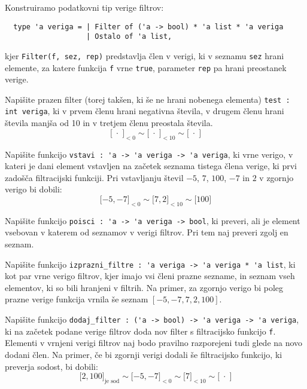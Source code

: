 \documentclass[arhiv]{../izpit}
\begin{document}
\naloga[]
\newcommand{\ostalo}[1]{\big[ #1 \big]}
\newcommand{\filter}[2]{\ostalo{ #2 }_{#1}}
\newcommand{\nic}{\;{\cdot}\;}
Konstruiramo podatkovni tip verige filtrov:
\begin{verbatim}
  type 'a veriga = | Filter of ('a -> bool) * 'a list * 'a veriga
                   | Ostalo of 'a list,
\end{verbatim}
kjer \verb|Filter(f, sez, rep)| predstavlja člen v verigi, ki v seznamu \verb|sez| hrani elemente,
za katere funkcija \verb|f| vrne \verb|true|, parameter \verb|rep| pa hrani preostanek verige.

\podnaloga
Napišite prazen filter (torej takšen, ki še ne hrani nobenega elementa) \verb|test : int veriga|,
ki v prvem členu hrani negativna števila, v drugem členu hrani števila manjša od 10 in
v tretjem členu preostala števila.
\[
  \filter{< 0}{\nic} \sim \filter{< 10}{\nic} \sim \ostalo{\nic}
\]

\podnaloga
Napišite funkcijo \verb|vstavi : 'a -> 'a veriga -> 'a veriga|,
ki vrne verigo, v kateri je dani element vstavljen na začetek seznama tistega člena verige, ki prvi zadošča filtracijski funkciji.
Pri vstavljanju števil $-5$, $7$, $100$, $-7$ in $2$ v zgornjo verigo bi dobili:
\[
  \filter{< 0}{{-5}, -7} \sim \filter{< 10}{7, 2} \sim \ostalo{100}
\]

\podnaloga
Napišite funkcijo \verb|poisci : 'a -> 'a veriga -> bool|,
ki preveri, ali je element vsebovan v katerem od seznamov v verigi filtrov. Pri tem naj preveri zgolj en seznam.

\podnaloga
Napišite funkcijo \verb|izprazni_filtre : 'a veriga -> 'a veriga * 'a list|,
ki kot par vrne verigo filtrov, kjer imajo vsi členi prazne sezname, in seznam vseh
elementov, ki so bili hranjeni v filtrih. Na primer, za zgornjo verigo bi poleg prazne verige funkcija vrnila še seznam $[{-5}, -7, 7, 2, 100]$.

\podnaloga
Napišite funkcijo \verb|dodaj_filter : ('a -> bool) -> 'a veriga -> 'a veriga|,
ki na začetek podane verige filtrov doda nov filter s filtracijsko funkcijo \verb|f|.
Elementi v vrnjeni verigi filtrov naj bodo pravilno razporejeni tudi glede na novo dodani člen. Na primer, če bi zgornji verigi dodali še filtracijsko funkcijo, ki preverja sodost, bi dobili:
\[
  \filter{\text{je sod}}{2, 100} \sim \filter{< 0}{{-5}, -7} \sim \filter{< 10}{7} \sim \ostalo{\nic}
\]
\end{document}
